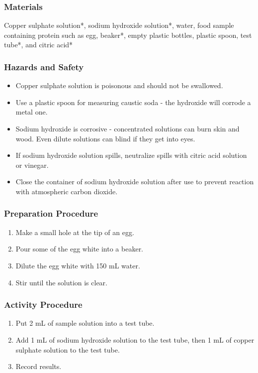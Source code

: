 \subsubsection*{Materials}
Copper sulphate solution*, sodium hydroxide solution*, water, food sample containing protein such as egg, beaker*, empty plastic bottles, plastic spoon, test tube*, and citric acid*

\subsubsection*{Hazards and Safety}
\begin{itemize}
\item{Copper sulphate solution is poisonous and should not be swallowed.}
\item{Use a plastic spoon for measuring caustic soda - the hydroxide will corrode a metal one.}
\item{Sodium hydroxide is corrosive - concentrated solutions can burn skin and wood. Even dilute solutions can blind if they get into eyes.}
\item{If sodium hydroxide solution spills, neutralize spills with citric acid solution or vinegar.}
\item{Close the container of sodium hydroxide solution after use to prevent reaction with atmospheric carbon dioxide.}
\end{itemize}

\subsubsection*{Preparation Procedure}
\begin{enumerate}
\item{Make a small hole at the tip of an egg.}
\item{Pour some of the egg white into a beaker.}
\item{Dilute the egg white with 150 mL water.}
\item{Stir until the solution is clear.}
\end{enumerate}

\subsubsection*{Activity Procedure}
\begin{enumerate}
\item{Put 2 mL of sample solution into a test tube.}
\item{Add 1 mL of sodium hydroxide solution to the test tube, then 1 mL of copper sulphate solution to the test tube.}
\item{Record results.}
\end{enumerate}

